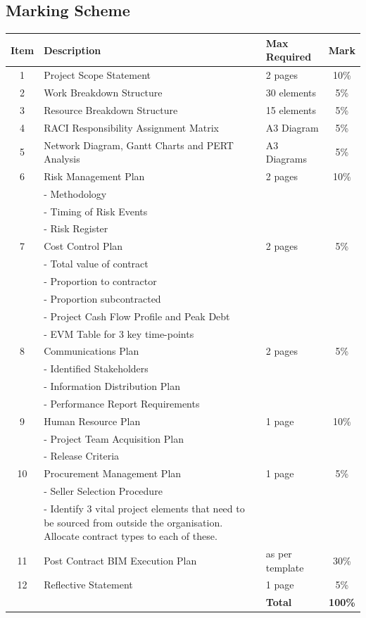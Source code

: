 \subsection{Marking Scheme}

\begin{tabularx}{\textwidth}{ |c|X|l|c| }
		\hline
		\textbf{Item} & \textbf{Description} & \textbf{Max Required} & \textbf{Mark} \\
		\hline
		\hline
		1  & Project Scope Statement &  2 pages  & 10\% \\
		\hline
		2  & Work Breakdown Structure &  30 elements  & 5\% \\
		\hline
		3  & Resource Breakdown Structure &  15 elements  & 5\% \\
		\hline
		4  & RACI Responsibility Assignment Matrix &  A3 Diagram  & 5\% \\
		\hline
		5  & Network Diagram, Gantt Charts and PERT Analysis &  A3 Diagrams  & 5\% \\
		\hline
		6  & Risk Management Plan & 2 pages  & 10\% \\
		&	- Methodology  & & \\
		&	- Timing of Risk Events  & & \\
		&	- Risk Register  & & \\
		\hline
		7  & Cost Control Plan &  2 pages  & 5\% \\
		&	- Total value of contract  & & \\
		&	- Proportion to contractor  & & \\
		&	- Proportion subcontracted   & & \\
		&	- Project Cash Flow Profile and Peak Debt  & & \\
		&	- EVM Table for 3 key time-points  & & \\
		\hline
		8  & Communications Plan &  2 pages  & 5\% \\
		&	- Identified Stakeholders  & & \\
		&	- Information Distribution Plan  & & \\
		&	- Performance Report Requirements  & & \\
		\hline
		9  & Human Resource Plan &  1 page  & 10\% \\
		&	- Project Team Acquisition Plan & & \\
		&	- Release Criteria  & & \\
		\hline
		10  & Procurement Management Plan &  1 page  & 5\% \\
		&	- Seller Selection Procedure  & & \\
		&	- Identify 3 vital project elements that need to be sourced from outside the organisation.  Allocate contract types to each of these.  & & \\
		\hline
		11  & Post Contract BIM Execution Plan &  as per template  & 30\% \\
		\hline
		12  & Reflective Statement &  1 page  & 5\% \\
		\hline
		\hline
		& & \textbf{Total} & \textbf{100\%} \\
		\hline
\end{tabularx}




